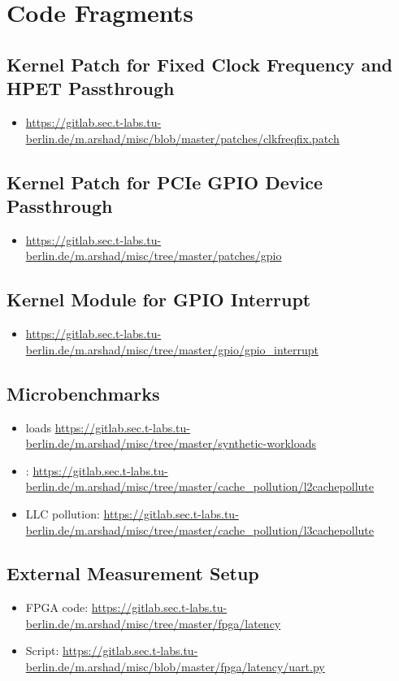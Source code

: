\chapter{Code Fragments} \label{app:a}

\section{Kernel Patch for Fixed Clock Frequency and HPET Passthrough}
\begin{itemize}
	\item \url{https://gitlab.sec.t-labs.tu-berlin.de/m.arshad/misc/blob/master/patches/clkfreqfix.patch}
\end{itemize}	

\section{Kernel Patch for PCIe GPIO Device Passthrough}
\begin{itemize}
	\item \url{https://gitlab.sec.t-labs.tu-berlin.de/m.arshad/misc/tree/master/patches/gpio}
\end{itemize}	

\section{Kernel Module for GPIO Interrupt}
\begin{itemize}
	\item \url{https://gitlab.sec.t-labs.tu-berlin.de/m.arshad/misc/tree/master/gpio/gpio_interrupt}
\end{itemize}	

\section{Microbenchmarks}
\begin{itemize}
	\item {loads} {\url{https://gitlab.sec.t-labs.tu-berlin.de/m.arshad/misc/tree/master/synthetic-workloads}}
	\item {\mcachepressure{}:} \url{https://gitlab.sec.t-labs.tu-berlin.de/m.arshad/misc/tree/master/cache_pollution/l2cachepollute}
	\item {LLC pollution:} \url{https://gitlab.sec.t-labs.tu-berlin.de/m.arshad/misc/tree/master/cache_pollution/l3cachepollute}
\end{itemize}	


\section{External Measurement Setup}
\begin{itemize}
	\item{FPGA code:} \url{https://gitlab.sec.t-labs.tu-berlin.de/m.arshad/misc/tree/master/fpga/latency}
	\item{Script:} \url{https://gitlab.sec.t-labs.tu-berlin.de/m.arshad/misc/blob/master/fpga/latency/uart.py}
\end{itemize}	



